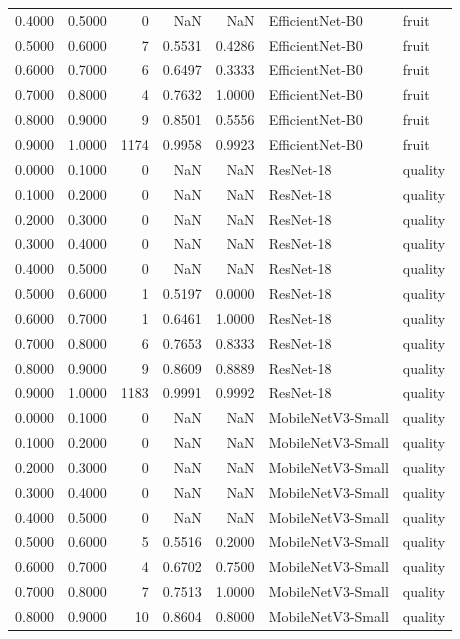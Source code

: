\begin{tabular}{rrrrrll}
0.4000 & 0.5000 & 0 & NaN & NaN & EfficientNet-B0 & fruit \\
0.5000 & 0.6000 & 7 & 0.5531 & 0.4286 & EfficientNet-B0 & fruit \\
0.6000 & 0.7000 & 6 & 0.6497 & 0.3333 & EfficientNet-B0 & fruit \\
0.7000 & 0.8000 & 4 & 0.7632 & 1.0000 & EfficientNet-B0 & fruit \\
0.8000 & 0.9000 & 9 & 0.8501 & 0.5556 & EfficientNet-B0 & fruit \\
0.9000 & 1.0000 & 1174 & 0.9958 & 0.9923 & EfficientNet-B0 & fruit \\
0.0000 & 0.1000 & 0 & NaN & NaN & ResNet-18 & quality \\
0.1000 & 0.2000 & 0 & NaN & NaN & ResNet-18 & quality \\
0.2000 & 0.3000 & 0 & NaN & NaN & ResNet-18 & quality \\
0.3000 & 0.4000 & 0 & NaN & NaN & ResNet-18 & quality \\
0.4000 & 0.5000 & 0 & NaN & NaN & ResNet-18 & quality \\
0.5000 & 0.6000 & 1 & 0.5197 & 0.0000 & ResNet-18 & quality \\
0.6000 & 0.7000 & 1 & 0.6461 & 1.0000 & ResNet-18 & quality \\
0.7000 & 0.8000 & 6 & 0.7653 & 0.8333 & ResNet-18 & quality \\
0.8000 & 0.9000 & 9 & 0.8609 & 0.8889 & ResNet-18 & quality \\
0.9000 & 1.0000 & 1183 & 0.9991 & 0.9992 & ResNet-18 & quality \\
0.0000 & 0.1000 & 0 & NaN & NaN & MobileNetV3-Small & quality \\
0.1000 & 0.2000 & 0 & NaN & NaN & MobileNetV3-Small & quality \\
0.2000 & 0.3000 & 0 & NaN & NaN & MobileNetV3-Small & quality \\
0.3000 & 0.4000 & 0 & NaN & NaN & MobileNetV3-Small & quality \\
0.4000 & 0.5000 & 0 & NaN & NaN & MobileNetV3-Small & quality \\
0.5000 & 0.6000 & 5 & 0.5516 & 0.2000 & MobileNetV3-Small & quality \\
0.6000 & 0.7000 & 4 & 0.6702 & 0.7500 & MobileNetV3-Small & quality \\
0.7000 & 0.8000 & 7 & 0.7513 & 1.0000 & MobileNetV3-Small & quality \\
0.8000 & 0.9000 & 10 & 0.8604 & 0.8000 & MobileNetV3-Small & quality \\

\end{tabular}
